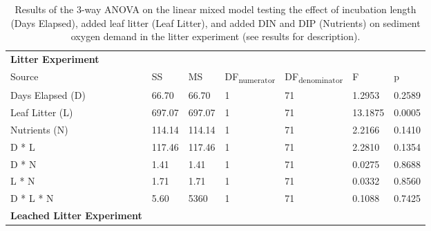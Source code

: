 \begin{table}
\label{tab:spec_stats}
\begin{tabular}{ l l l l l l l }
\textbf{Litter Experiment} & & & & & & \\
Source           & SS      & MS     & DF\textsubscript{numerator} & DF\textsubscript{denominator} & F       & p  \\
Days Elapsed (D) & 66.70   & 66.70  & 1                           & 71                            & 1.2953  & 0.2589 \\
Leaf Litter (L)  & 697.07  & 697.07 & 1                           & 71                            & 13.1875 & 0.0005 \\
Nutrients (N)    & 114.14  & 114.14 & 1                           & 71                            & 2.2166  & 0.1410 \\
D * L            & 117.46  & 117.46 & 1                           & 71                            & 2.2810  & 0.1354 \\
D * N            & 1.41    & 1.41   & 1                           & 71                            & 0.0275  & 0.8688 \\
L * N            & 1.71    & 1.71   & 1                           & 71                            & 0.0332  & 0.8560 \\
D * L * N        & 5.60    & 5360   & 1                           & 71                            & 0.1088  & 0.7425 \\

\textbf{Leached Litter Experiment} & & & & & & \\

\end{tabular}
\caption{Results of the 3-way ANOVA on the linear mixed model testing the effect of incubation length (Days Elapsed), added leaf litter (Leaf Litter), and added DIN and DIP (Nutrients) on sediment oxygen demand in the litter experiment (see results for description).}
\end{table}